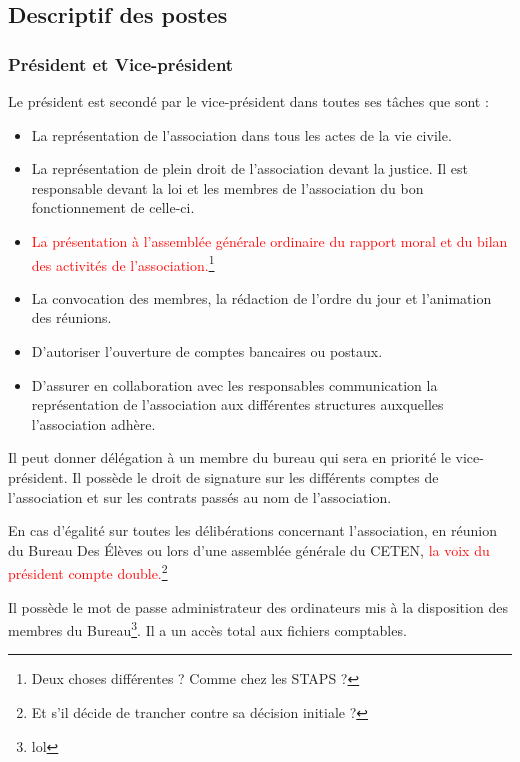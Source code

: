 \documentclass{article} %
\begin{document}
		\subsection{Descriptif des postes}

			\subsubsection{Président et Vice-président}

				Le président est secondé par le vice-président dans toutes ses
				tâches que sont :
				\begin{itemize}
					\item La représentation de l’association dans tous les actes
						de la vie civile.
					\item La représentation de plein droit de l’association
						devant la justice. Il est responsable devant la loi et
						les membres de l’association du bon fonctionnement de
						celle-ci.
					\item \textcolor{red}{La présentation à l’assemblée générale
						ordinaire du rapport moral et du bilan des activités de
						l’association.}\footnote{Deux choses différentes ? Comme
						chez les STAPS ?}
					\item La convocation des membres, la rédaction de l’ordre du
						jour et l’animation des réunions.
					\item D’autoriser l’ouverture de comptes bancaires ou
						postaux.
					\item D’assurer en collaboration avec les responsables
						communication la représentation de l’association aux
						différentes structures auxquelles l’association adhère. 
				\end{itemize}

				Il peut donner délégation à un membre du bureau qui sera en
				priorité le vice-président. Il possède le droit de signature sur
				les différents comptes de l'association et sur les contrats
				passés au nom de l’association.
				
				En cas d’égalité sur toutes les délibérations concernant
				l’association, en réunion du Bureau Des Élèves ou lors d’une
				assemblée générale du CETEN, \textcolor{red}{la voix du
				président compte double.}\footnote{Et s'il décide de trancher
				contre sa décision initiale ?}

				Il possède le mot de passe administrateur des ordinateurs mis à
				la disposition des membres du Bureau\footnote{lol}. Il a un
				accès total aux fichiers comptables.
\end{document}
